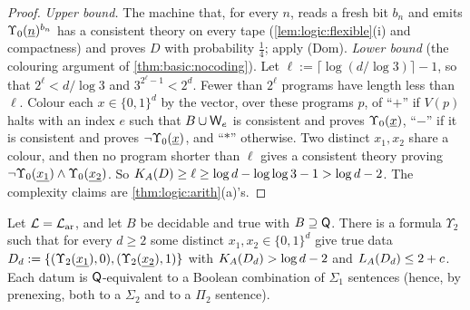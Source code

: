 \begin{proof}
\emph{Upper bound.} The machine that, for every $n$, reads a fresh bit $b_n$ and emits $\Upsilon_0(\underline{n})^{b_n}$ has a consistent theory on every tape (\cref{lem:logic:flexible}(i) and compactness) and proves $D$ with probability $\frac14$; apply (Dom). \emph{Lower bound} (the colouring argument of \cref{thm:basic:nocoding}). Let $\ell:=\lceil\log(d/\log3)\rceil-1$, so that $2^\ell<d/\log3$ and $3^{2^\ell-1}<2^d$. Fewer than $2^\ell$ programs have length less than $\ell$. Colour each $x\in\{0,1\}^d$ by the vector, over these programs $p$, of ``$+$'' if $V(p)$ halts with an index $e$ such that $B\cup\mathsf{W}_{e}$ is consistent and proves $\Upsilon_0(\underline{x})$, ``$-$'' if it is consistent and proves $\neg\Upsilon_0(\underline{x})$, and ``$*$'' otherwise. Two distinct $x_1,x_2$ share a colour, and then no program shorter than $\ell$ gives a consistent theory proving $\neg\Upsilon_0(\underline{x_1})\wedge\Upsilon_0(\underline{x_2})$. So $K_{A}(D)\ge\ell\ge\log d-\log\log3-1>\log d-2$. The complexity claims are \cref{thm:logic:arith}(a)'s.
\end{proof}

\begin{proposition}\label{prop:logic:boundary}
Let $\mathcal L=\mathcal{L}_{\mathrm{ar}}$, and let $B$ be decidable and true with $B\supseteq\mathsf{Q}$. There is a formula $\Upsilon_2$ such that for every $d\ge2$ some distinct $x_1,x_2\in\{0,1\}^d$ give true data $D_d:=\{(\Upsilon_2(\underline{x_1}),0),(\Upsilon_2(\underline{x_2}),1)\}$ with $K_{A}(D_d)>\log d-2$ and $L_{A}(D_d)\le2+c$. Each datum is $\mathsf{Q}$-equivalent to a Boolean combination of $\Sigma_1$ sentences (hence, by prenexing, both to a $\Sigma_2$ and to a $\Pi_2$ sentence).
\end{proposition}

